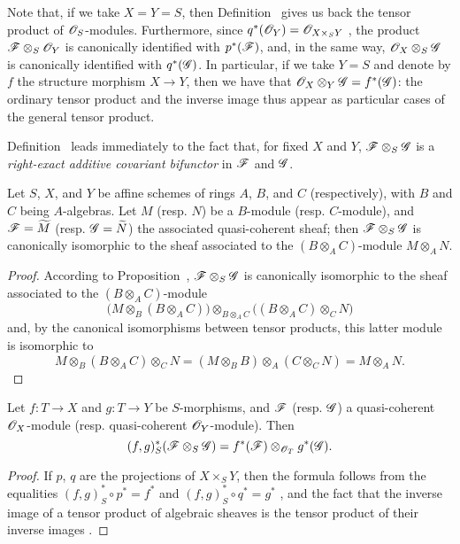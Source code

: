 Note that, if we take $X=Y=S$, then Definition~ gives us back the tensor
product of $\mathscr{O}_S$-modules. Furthermore, since $q^*(\mathscr{O}_Y)=\mathscr{O}_{X\times_S Y}$
, the product $\mathscr{F}\otimes_S\mathscr{O}_Y$ is canonically
identified with $p^*(\mathscr{F})$, and, in the same way,
$\mathscr{O}_X\otimes_S\mathscr{G}$ is canonically identified with $q^*(\mathscr{G})$. In
particular, if we take $Y=S$ and denote by $f$ the structure morphism $X\to Y$,
then we have that $\mathscr{O}_X\otimes_Y\mathscr{G}=f^*(\mathscr{G})$: the ordinary tensor
product and the inverse image thus appear as particular cases of the general
tensor product.

Definition~ leads immediately to the fact that, for fixed $X$ and
$Y$, $\mathscr{F}\otimes_S\mathscr{G}$ is a \emph{right-exact additive covariant bifunctor} in $\mathscr{F}$ and $\mathscr{G}$.

\begin{proposition}[9.1.3]
\label{I.9.1.3}
Let $S$, $X$, and $Y$ be affine schemes of rings
$A$, $B$, and $C$ (respectively), with $B$ and $C$ being $A$-algebras. Let $M$
(resp. $N$) be a $B$-module (resp. $C$-module), and
$\mathscr{F}=\widetilde{M}$ (resp. $\mathscr{G}=\widetilde{N}$) the
associated quasi-coherent sheaf; then $\mathscr{F}\otimes_S\mathscr{G}$ is
canonically isomorphic to the sheaf associated to the $(B\otimes_A C)$-module
$M\otimes_A N$.
\end{proposition}

\begin{proof}
According to Proposition~, $\mathscr{F}\otimes_S\mathscr{G}$
is canonically isomorphic to the sheaf associated to the $(B\otimes_A C)$-module
\[
  \big(M\otimes_B(B\otimes_A C)\big)\otimes_{B\otimes_A C}\big((B\otimes_A C)\otimes_C N\big)
\]
and, by the canonical isomorphisms between tensor products, this latter module is isomorphic to
\[
  M\otimes_B(B\otimes_A C)\otimes_C N=(M\otimes_B B)\otimes_A(C\otimes_C N)=M\otimes_A N.
\]
\end{proof}

\begin{proposition}[9.1.4]
\label{I.9.1.4}
Let $f:T\to X$ and $g:T\to Y$ be $S$-morphisms, and $\mathscr{F}$ (resp. $\mathscr{G}$) a quasi-coherent $\mathscr{O}_X$-module (resp. quasi-coherent $\mathscr{O}_Y$-module).
Then
\[
  (f,g)^*_S(\mathscr{F}\otimes_S\mathscr{G})=f^*(\mathscr{F})\otimes_{\mathscr{O}_T}g^*(\mathscr{G}).
\]
\end{proposition}

\begin{proof}
If $p$, $q$ are the projections of $X\times_S Y$, then the formula follows
from the equalities $(f,g)^*_S\circ p^*=f^*$ and
$(f,g)^*_S\circ q^*=g^*$ , and the fact that the inverse
image of a tensor product of algebraic sheaves is the tensor product of their inverse
images .
\end{proof}

